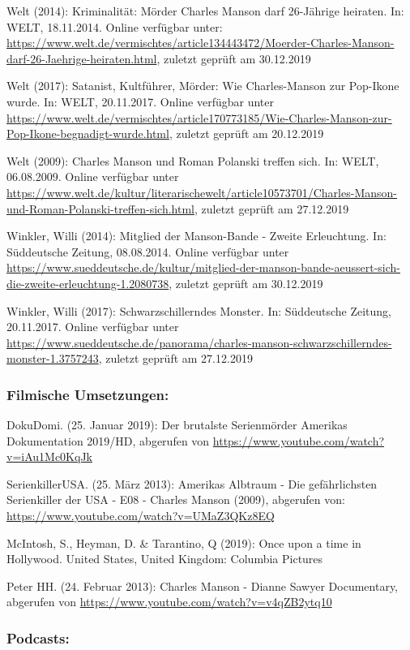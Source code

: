 \documentclass[
]{article}
\begin{document}
Welt (2014): Kriminalität: Mörder Charles Manson darf 26-Jährige
heiraten. In: WELT, 18.11.2014. Online verfügbar unter:
\url{https://www.welt.de/vermischtes/article134443472/Moerder-Charles-Manson-darf-26-Jaehrige-heiraten.html},
zuletzt geprüft am 30.12.2019

Welt (2017): Satanist, Kultführer, Mörder: Wie Charles-Manson zur
Pop-Ikone wurde. In: WELT, 20.11.2017. Online verfügbar unter
\url{https://www.welt.de/vermischtes/article170773185/Wie-Charles-Manson-zur-Pop-Ikone-begnadigt-wurde.html},
zuletzt geprüft am 20.12.2019

Welt (2009): Charles Manson und Roman Polanski treffen sich. In: WELT,
06.08.2009. Online verfügbar unter
\url{https://www.welt.de/kultur/literarischewelt/article10573701/Charles-Manson-und-Roman-Polanski-treffen-sich.html},
zuletzt geprüft am 27.12.2019

Winkler, Willi (2014): Mitglied der Manson-Bande - Zweite Erleuchtung.
In: Süddeutsche Zeitung, 08.08.2014. Online verfügbar unter
\url{https://www.sueddeutsche.de/kultur/mitglied-der-manson-bande-aeussert-sich-die-zweite-erleuchtung-1.2080738},
zuletzt geprüft am 30.12.2019

Winkler, Willi (2017): Schwarzschillerndes Monster. In: Süddeutsche
Zeitung, 20.11.2017. Online verfügbar unter
\url{https://www.sueddeutsche.de/panorama/charles-manson-schwarzschillerndes-monster-1.3757243},
zuletzt geprüft am 27.12.2019

\hypertarget{filmische-umsetzungen}{%
\subsubsection{Filmische Umsetzungen:}\label{filmische-umsetzungen}}

DokuDomi. (25. Januar 2019): Der brutalste Serienmörder Amerikas
\textbar{} Dokumentation 2019/HD, abgerufen von
\url{https://www.youtube.com/watch?v=iAu1Mc0KqJk}

SerienkillerUSA. (25. März 2013): Amerikas Albtraum - Die gefährlichsten
Serienkiller der USA - E08 - Charles Manson (2009), abgerufen von:
\url{https://www.youtube.com/watch?v=UMaZ3QKz8EQ}

McIntosh, S., Heyman, D. \& Tarantino, Q (2019): Once upon a time in
Hollywood. United States, United Kingdom: Columbia Pictures

Peter HH. (24. Februar 2013): Charles Manson - Dianne Sawyer
Documentary, abgerufen von
\url{https://www.youtube.com/watch?v=v4qZB2ytq10}

\hypertarget{podcasts}{%
\subsubsection{Podcasts:}\label{podcasts}}
\end{document}

